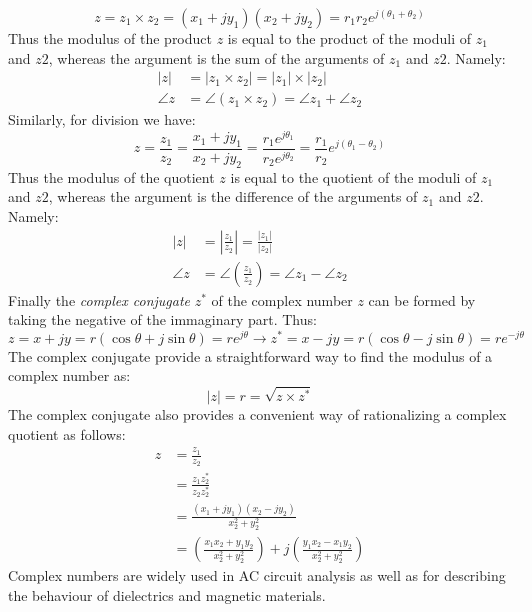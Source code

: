 \[z = z_1 \times z_2 = (x_1 + jy_1)(x_2 + jy_2) = r_1r_2e^{j(\theta_1+\theta_2)}\]
Thus the modulus of the product $z$ is equal to the product of the moduli of $z_1$ and $z2$, whereas the argument is the sum of the arguments of $z_1$ and $z2$. Namely:
\begin{equation}
\begin{split}
|z| &= |z_1\times z_2| = |z_1|\times|z_2|\\
\angle z &= \angle(z_1\times z_2) = \angle z_1 + \angle z_2
\end{split}
\end{equation}
Similarly, for division we have:
\[z=\frac{z_1}{z_2}=\frac{x_1+jy_1}{x_2+jy_2}=\frac{r_1e^{j\theta_1}}{r_2e^{j\theta_2}}=\frac{r_1}{r_2}e^{j(\theta_1-\theta_2)}\]
Thus the modulus of the quotient $z$ is equal to the quotient of the moduli of $z_1$ and $z2$, whereas the argument is the difference of the arguments of $z_1$ and $z2$. Namely:
\begin{equation}
\begin{split}
|z| &= \left|\frac{z_1}{z_2}\right| = \frac{|z_1|}{|z_2|}\\
\angle z &= \angle\left(\frac{z_1}{z_2}\right) = \angle z_1 - \angle z_2
\end{split}
\end{equation}
Finally the \emph{complex conjugate} $z^*$ of the complex number $z$ can be formed by taking the negative of the immaginary part. Thus:
\[z = x +jy = r(\cos\theta+j\sin\theta) = re^{j\theta}\longrightarrow z^* = x -jy=r(\cos\theta -j\sin\theta) = re^{-j\theta}\]
The complex conjugate provide a straightforward way to find the modulus of a complex number as:
\[|z|= r = \sqrt{z\times z^*}\]
The complex conjugate also provides a convenient way of rationalizing a complex quotient as follows:
\begin{equation}
\begin{split}
z &= \frac{z_1}{z_2}\\
  &=\frac{z_1z_2^*}{z_2z_2^*}\\
  &= \frac{(x_1+jy_1)(x_2-jy_2)}{x_2^2+y_2^2}\\
  &= \left(\frac{x_1x_2+y_1y_2}{x_2^2+y_2^2}\right) +j\left(\frac{y_1x_2 - x_1y_2}{x_2^2+y_2^2}\right)
\end{split}
\end{equation}
Complex numbers are widely used in AC circuit analysis as well as for describing the behaviour of dielectrics and magnetic materials.